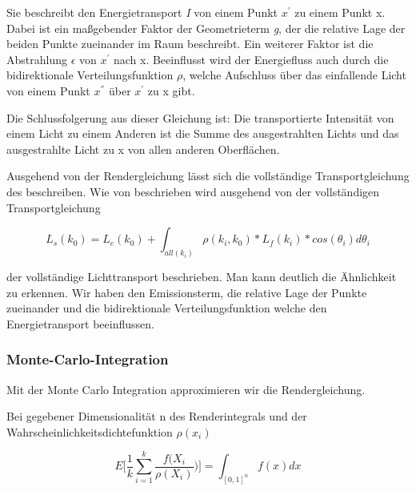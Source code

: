 Sie beschreibt den Energietransport \textit{I} von einem Punkt ${x}^{'}$
zu einem Punkt x. Dabei ist ein maßgebender Faktor der Geometrieterm \textit{g},
der die relative Lage der beiden Punkte zueinander im Raum beschreibt.
Ein weiterer Faktor ist die Abstrahlung \textit{$\epsilon$} von ${x}^{'}$ nach x. 
Beeinflusst wird der Energiefluss auch durch
die bidirektionale Verteilungsfunktion \textit{$\rho$}, welche Aufschluss über
das einfallende Licht von einem Punkt ${x}^{''}$ über ${x}^{'}$ zu x gibt.\par
Die Schlussfolgerung aus dieser Gleichung  ist: Die transportierte
Intensität von einem Licht zu einem Anderen ist die Summe des ausgestrahlten Lichts 
und das ausgestrahlte Licht zu x von allen anderen Oberflächen.

Ausgehend von der Rendergleichung  lässt sich
die vollständige Transportgleichung des 
beschreiben.
Wie von \cite{marschner2009fundamentals} beschrieben wird ausgehend von der vollständigen Transportgleichung

\begin{equation}\label{eq:vollständige Transportgleichung}
    L_s(k_0) = L_e(k_0) + \int_{all(k_i)}^{} \rho(k_i, k_0)*L_f(k_i)*cos(\theta_i)d\theta_i
\end{equation}

der vollständige Lichttransport beschrieben. Man kann deutlich die Ähnlichkeit
zu  erkennen. Wir haben den Emissionsterm, die relative Lage der 
Punkte zueinander und die bidirektionale Verteilungsfunktion welche den Energietransport
beeinflussen.


\subsubsection{Monte-Carlo-Integration}
Mit der Monte Carlo Integration approximieren wir die Rendergleichung.\par 
Bei gegebener Dimensionalität n des Renderintegrals und der 
Wahrscheinlichkeitsdichtefunktion $\rho(x_i)$
\cite{KK02}

\begin{equation}\label{eq:Monte-Carlo}
    E\biggl[\frac{1}{k}\sum_{i=1}^{k}\frac{f(X_{i}}{\rho(X_{i})})\biggl] = \int_{[0,1]^{n}}f(x)dx
\end{equation}

